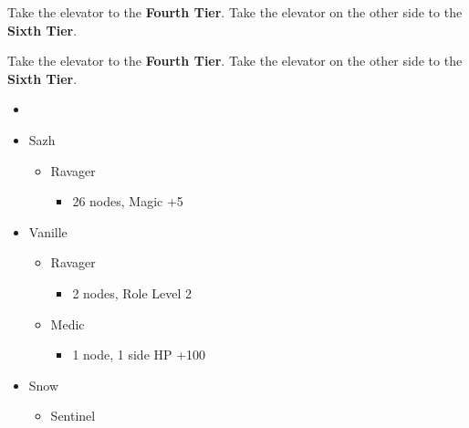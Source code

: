 \begin{paracol}{2}
	Take the elevator to the \textbf{Fourth Tier}.
	Take the elevator on the other side to the \textbf{Sixth Tier}.
	\switchcolumn

	Take the elevator to the \textbf{Fourth Tier}.
	Take the elevator on the other side to the \textbf{Sixth Tier}.
	\switchcolumn*
	\begin{menu}
		\begin{itemize}
			\paradigm
			\begin{itemize}
				\item {}%
				      {\paradigmline[1]{\textit{\syn}}{\textit{\sab}}{\textit{\rav}}}%
				      {\paradigmline{\com}{\rav}{\rav}}%
				      {\paradigmline{\syn}{\med}{\com}}%
				      {\paradigmline{\com}{\med}{\com}}%
				      {\paradigmline{(\rav)}{\sab}{(\rav)}}%
				      {\paradigmline{\com}{\rav}{\com}}
			\end{itemize}
			\crystarium
			\begin{itemize}
				\item Sazh
				      \begin{itemize}
					      \item Ravager
					            \begin{itemize}
						            \item 26 nodes, Magic +5
					            \end{itemize}
				      \end{itemize}
				\item Vanille
				      \begin{itemize}
					      \item Ravager
					            \begin{itemize}
						            \item 2 nodes, Role Level 2
					            \end{itemize}
					      \item Medic
					            \begin{itemize}
						            \item 1 node, 1 side HP +100
					            \end{itemize}
				      \end{itemize}
				\item Snow
				      \begin{itemize}
					      \item Sentinel
					            \begin{itemize}

\end{itemize}
\end{itemize}
\end{itemize}
\end{itemize}
\end{menu}
\end{paracol}
